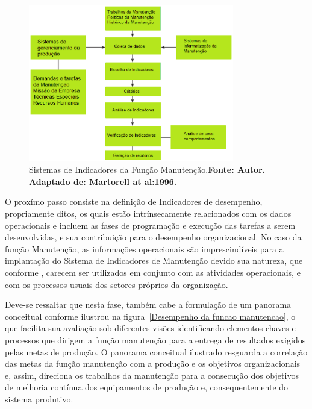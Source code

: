 \graphicspath{{figuras/}}
\begin{figure}[h]
\centering
\includegraphics[width=0.8\textwidth]{Sistemas_de_Indicadores_da_Manuten_o.eps}
\caption{Sistemas de Indicadores da Função Manutenção.\textbf{Fonte: Autor. Adaptado de: Martorell at al:1996.}}
\label{Sistemas de Indicadores da Manutencao}
\end{figure}

O proxímo passo consiste na definição de Indicadores de desempenho, propriamente ditos, os quais estão intrínsecamente relacionados com os dados operacionais e incluem as fases de programação e execução das tarefas a serem desenvolvidas, e sua contribuição para o desempenho organizacional. No caso da função Manutenção, as informações operacionais são imprescindíveis para a implantação do Sistema de Indicadores de Manutenção devido sua natureza, que conforme \cite{martorell1999}, carecem ser utilizados em conjunto com as atividades operacionais, e com os processos usuais dos setores próprios da organização.

Deve-se ressaltar que nesta fase, também cabe a formulação de um panorama conceitual conforme ilustrou \cite{muchiri2011development} na figura~\ref{Desempenho da funcao manutencao}, o que facilita sua avaliação sob diferentes visões identificando elementos chaves e processos que dirigem a função manutenção para a entrega de resultados exigidos pelas metas de produção.
O panorama conceitual ilustrado resguarda a correlação das metas da função manutenção com a produção e os objetivos organizacionais e, assim, direciona os trabalhos da manutenção para a consecução dos objetivos de melhoria contínua dos equipamentos de produção e, consequentemente do sistema produtivo.

